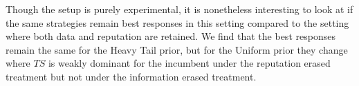 \documentclass{article}
\theoremstyle{definition}
\begin{document}
Though the setup is purely experimental, it is nonetheless interesting to look at if the same strategies remain best responses in this setting compared to the setting where both data and reputation are retained. We find that the best responses remain the same for the Heavy Tail prior, but for the Uniform prior they change where $TS$ is weakly dominant for the incumbent under the reputation erased treatment but not under the information erased treatment.


\end{document}
